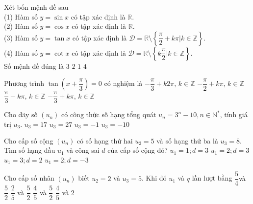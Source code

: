 \begin{ex}%
	Xét bốn mệnh đề sau\\
	(1) Hàm số $y=\sin x$ có tập xác định là $\mathbb{R}$.\\
	(2) Hàm số $y=\cos x$ có tập xác định là $\mathbb{R}$.\\
	(3) Hàm số $y=\tan x$ có tập xác định là $\mathscr{D}=\mathbb{R}\setminus \left\{\dfrac{\pi}{2}+k\pi \left| k\in \mathbb{Z}\right.\right\}$.\\
	(4) Hàm số $y=\cot x$ có tập xác định là $\mathscr{D}=\mathbb{R}\setminus \left\{k\dfrac{\pi}{2}\left| k\in \mathbb{Z}\right.\right\}$.\\
	Số mệnh đề đúng là
	\choice
	{\True $3$}
	{$2$}
	{$1$}
	{$4$}
\end{ex}

\begin{ex}%
	Phương trình $\tan \left(x+\dfrac{\pi}{3}\right)=0$ có nghiệm là
	\choice
	{$-\dfrac{\pi}{3}+k2\pi$, $k\in \mathbb{Z}$}
	{$-\dfrac{\pi}{2}+k\pi$, $k\in \mathbb{Z}$}
	{$\dfrac{\pi}{3}+k\pi$, $k\in \mathbb{Z}$}
	{\True $-\dfrac{\pi}{3}+k\pi$, $k\in \mathbb{Z}$}
\end{ex}
\begin{ex}%
	Cho dãy số $(u_n)$ có công thức số hạng tổng quát $u_n=3^n-10,n\in{\mathbb{N}^{*}}$, tính giá trị $u_3$.
	\choice
	{\True $u_3=17$}
	{$u_3=27$}
	{$u_3=-1$}
	{$u_3=-10$}
\end{ex}
\begin{ex}%
	Cho cấp số cộng $(u_n)$ có số hạng thứ hai $u_2=5$ và số hạng thứ ba là $u_3=8$. Tìm số hạng đầu $u_1$ và công sai $d$ của cấp số cộng đó?
	\choice
	{$u_1=1;d=3$}
	{\True $u_1=2;d=3$}
	{$u_1=3;d=2$}
	{$u_1=2;d=-3$}
\end{ex}

\begin{ex}%
	Cho cấp số nhân $(u_n)$ biết $u_2=2$ và $u_3=5$. Khi đó $u_1$ và $q$ lần lượt bằng
	\choice
	{$\dfrac{5}{4}$và $\dfrac{5}{2}$}
	{$\dfrac{2}{5}$ và $\dfrac{5}{2}$}
	{\True $\dfrac{4}{5}$ và $\dfrac{5}{2}$}
	{$\dfrac{4}{5}$ và $2$}
\end{ex}

